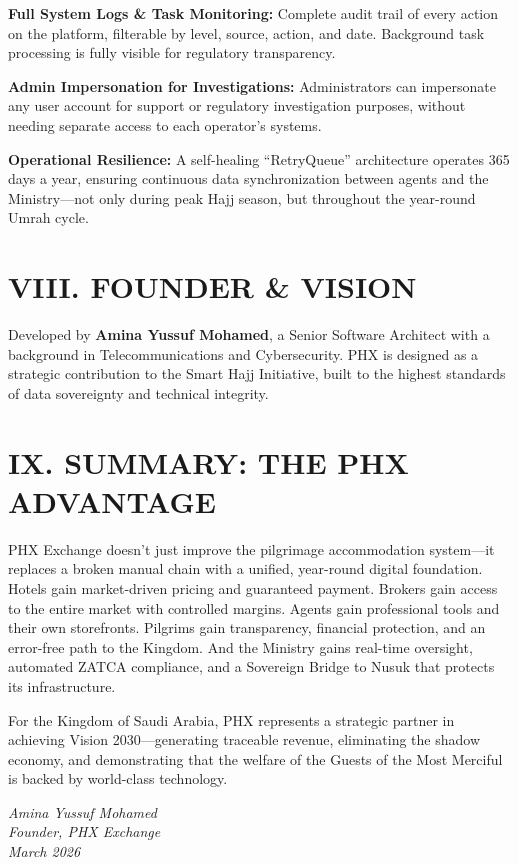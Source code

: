 \documentclass[11pt,a4paper]{article}
\begin{document}
\textbf{Full System Logs \& Task Monitoring:} Complete audit trail of every action on the platform, filterable by level, source, action, and date. Background task processing is fully visible for regulatory transparency.

\vspace{0.3cm}

\textbf{Admin Impersonation for Investigations:} Administrators can impersonate any user account for support or regulatory investigation purposes, without needing separate access to each operator's systems.

\vspace{0.3cm}

\textbf{Operational Resilience:} A self-healing ``RetryQueue'' architecture operates 365 days a year, ensuring continuous data synchronization between agents and the Ministry---not only during peak Hajj season, but throughout the year-round Umrah cycle.

\section*{VIII. FOUNDER \& VISION}

Developed by \textbf{Amina Yussuf Mohamed}, a Senior Software Architect with a background in Telecommunications and Cybersecurity. PHX is designed as a strategic contribution to the Smart Hajj Initiative, built to the highest standards of data sovereignty and technical integrity.

\section*{IX. SUMMARY: THE PHX ADVANTAGE}

PHX Exchange doesn't just improve the pilgrimage accommodation system---it replaces a broken manual chain with a unified, year-round digital foundation. Hotels gain market-driven pricing and guaranteed payment. Brokers gain access to the entire market with controlled margins. Agents gain professional tools and their own storefronts. Pilgrims gain transparency, financial protection, and an error-free path to the Kingdom. And the Ministry gains real-time oversight, automated ZATCA compliance, and a Sovereign Bridge to Nusuk that protects its infrastructure.

For the Kingdom of Saudi Arabia, PHX represents a strategic partner in achieving Vision 2030---generating traceable revenue, eliminating the shadow economy, and demonstrating that the welfare of the Guests of the Most Merciful is backed by world-class technology.

\vspace{2cm}

\begin{center}
\textit{Amina Yussuf Mohamed}\\
\textit{Founder, PHX Exchange}\\
\textit{March 2026}
\end{center}
\end{document}
